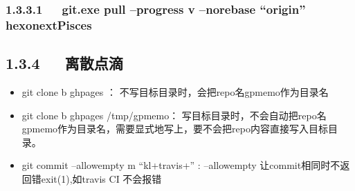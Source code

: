 \documentclass[letterpaper,12pt,english]{sphinxmanual}
\begin{document}
\subsubsection{1.3.3.1   git.exe pull –progress \sphinxhyphen{}v –no\sphinxhyphen{}rebase “origin” hexo\sphinxhyphen{}next\sphinxhyphen{}Pisces}
\label{\detokenize{001software/001install/001._u7f51_u7ad9/github:git-exe-pull-progress-v-no-rebase-origin-hexo-next-pisces}}
\begin{sphinxVerbatim}[commandchars=\\\{\}]
      

 
               
 \PYG{p}{[}  \PYG{p}{]}        
   

      
\end{sphinxVerbatim}


\subsection{1.3.4   离散点滴}
\label{\detokenize{001software/001install/001._u7f51_u7ad9/github:id7}}\begin{itemize}
\item {} 
git clone \sphinxhyphen{}b gh\sphinxhyphen{}pages ： 不写目标目录时，会把repo名gp\sphinxhyphen{}memo作为目录名

\item {} 
git clone \sphinxhyphen{}b gh\sphinxhyphen{}pages  /tmp/gp\sphinxhyphen{}memo： 写目标目录时，不会自动把repo名gp\sphinxhyphen{}memo作为目录名，需要显式地写上，要不会把repo内容直接写入目标目录。

\item {} 
git commit –allow\sphinxhyphen{}empty \sphinxhyphen{}m “kl+travis+” : –allow\sphinxhyphen{}empty 让commit相同时不返回错exit(1),如travis CI 不会报错

\end{itemize}
\end{document}

